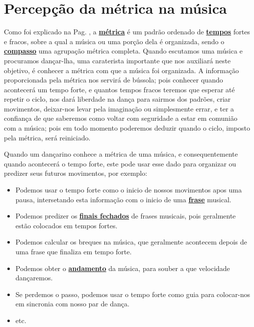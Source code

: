
\section{Percepção da métrica na música}
\label{sec:percepcionmetrica}
Como foi explicado na Pag. \pageref{def:Metrica}, 
a \hyperref[def:Metrica]{\textbf{métrica}} é um padrão ordenado de \hyperref[sec:Tempo]{\textbf{tempos}} fortes e fracos,
sobre a qual a música ou uma porção dela é organizada, 
sendo o \hyperref[def:Compasso]{\textbf{compasso}} uma agrupação métrica completa.
Quando escutamos uma música e procuramos dançar-lha, 
uma caraterista importante que nos auxiliará neste objetivo,
é conhecer a métrica com que a música foi organizada.
A informação proporcionada pela métrica nos servirá de bússola;
pois conhecer quando acontecerá um tempo forte, 
e quantos tempos fracos teremos que esperar até repetir o ciclo,
nos dará liberdade na dança para sairmos dos padrões, criar movimentos, deixar-nos levar pela imaginação ou simplesmente errar,
 e ter a confiança de que saberemos como voltar com seguridade a estar em comunião com a música;
pois em todo momento poderemos deduzir quando o ciclo, imposto pela métrica, será reiniciado.

Quando um dançarino conhece a métrica de uma música,
e consequentemente quando acontecerá o tempo forte,
este pode usar esse dado para  organizar ou predizer seus futuros movimentos, 
por exemplo:
\begin{itemize}
\item Podemos usar o tempo forte como o inicio de nossos movimentos apos uma pausa,  
intersetando esta informação com o inicio de uma \hyperref[sec:Frase]{\textbf{frase}} musical.
\item Podemos predizer os \hyperref[subsec:FinalAbertoFechado]{\textbf{finais fechados}} 
de frases musicais,
 pois geralmente estão colocados em tempos fortes.
\item Podemos calcular os breques na música, que geralmente  acontecem depois de uma frase que finaliza em tempo forte.
\item Podemos obter o \hyperref[sec:Andamento]{\textbf{andamento}} da música,
para souber a que velocidade dançaremos. 
\item Se perdemos o passo, podemos usar o tempo forte como guia para colocar-nos em sincronia com nosso par de dança.
\item etc.
\end{itemize}

